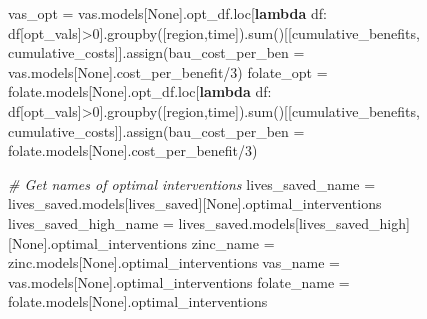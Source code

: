 \documentclass[
]{article}
\newenvironment{Shaded}{}{}
\newcommand{\BuiltInTok}[1]{#1}
\newcommand{\CommentTok}[1]{\textcolor[rgb]{0.38,0.63,0.69}{\textit{#1}}}
\newcommand{\DecValTok}[1]{\textcolor[rgb]{0.25,0.63,0.44}{#1}}
\newcommand{\KeywordTok}[1]{\textcolor[rgb]{0.00,0.44,0.13}{\textbf{#1}}}
\newcommand{\NormalTok}[1]{#1}
\newcommand{\OperatorTok}[1]{\textcolor[rgb]{0.40,0.40,0.40}{#1}}
\newcommand{\StringTok}[1]{\textcolor[rgb]{0.25,0.44,0.63}{#1}}
\newcommand{\VariableTok}[1]{\textcolor[rgb]{0.10,0.09,0.49}{#1}}
\begin{document}
\begin{Shaded}
\begin{Highlighting}[numbers=left,,]
\NormalTok{vas\_opt }\OperatorTok{=}\NormalTok{ vas.models[}\VariableTok{None}\NormalTok{].opt\_df.loc[}\KeywordTok{lambda}\NormalTok{ df: df[}\StringTok{\textquotesingle{}opt\_vals\textquotesingle{}}\NormalTok{]}\OperatorTok{\textgreater{}}\DecValTok{0}\NormalTok{].groupby([}\StringTok{\textquotesingle{}region\textquotesingle{}}\NormalTok{,}\StringTok{\textquotesingle{}time\textquotesingle{}}\NormalTok{]).}\BuiltInTok{sum}\NormalTok{()[[}\StringTok{\textquotesingle{}cumulative\_benefits\textquotesingle{}}\NormalTok{, }\StringTok{\textquotesingle{}cumulative\_costs\textquotesingle{}}\NormalTok{]].assign(bau\_cost\_per\_ben }\OperatorTok{=}\NormalTok{  vas.models[}\VariableTok{None}\NormalTok{].cost\_per\_benefit}\OperatorTok{/}\DecValTok{3}\NormalTok{)}
\NormalTok{folate\_opt }\OperatorTok{=}\NormalTok{ folate.models[}\VariableTok{None}\NormalTok{].opt\_df.loc[}\KeywordTok{lambda}\NormalTok{ df: df[}\StringTok{\textquotesingle{}opt\_vals\textquotesingle{}}\NormalTok{]}\OperatorTok{\textgreater{}}\DecValTok{0}\NormalTok{].groupby([}\StringTok{\textquotesingle{}region\textquotesingle{}}\NormalTok{,}\StringTok{\textquotesingle{}time\textquotesingle{}}\NormalTok{]).}\BuiltInTok{sum}\NormalTok{()[[}\StringTok{\textquotesingle{}cumulative\_benefits\textquotesingle{}}\NormalTok{, }\StringTok{\textquotesingle{}cumulative\_costs\textquotesingle{}}\NormalTok{]].assign(bau\_cost\_per\_ben }\OperatorTok{=}\NormalTok{  folate.models[}\VariableTok{None}\NormalTok{].cost\_per\_benefit}\OperatorTok{/}\DecValTok{3}\NormalTok{)}

\CommentTok{\# Get names of optimal interventions}
\NormalTok{lives\_saved\_name }\OperatorTok{=}\NormalTok{ lives\_saved.models[}\StringTok{\textquotesingle{}lives\_saved\textquotesingle{}}\NormalTok{][}\VariableTok{None}\NormalTok{].optimal\_interventions}
\NormalTok{lives\_saved\_high\_name }\OperatorTok{=}\NormalTok{ lives\_saved.models[}\StringTok{\textquotesingle{}lives\_saved\_high\textquotesingle{}}\NormalTok{][}\VariableTok{None}\NormalTok{].optimal\_interventions}
\NormalTok{zinc\_name }\OperatorTok{=}\NormalTok{ zinc.models[}\VariableTok{None}\NormalTok{].optimal\_interventions}
\NormalTok{vas\_name }\OperatorTok{=}\NormalTok{ vas.models[}\VariableTok{None}\NormalTok{].optimal\_interventions}
\NormalTok{folate\_name }\OperatorTok{=}\NormalTok{ folate.models[}\VariableTok{None}\NormalTok{].optimal\_interventions}


\end{Highlighting}
\end{Shaded}
\end{document}
